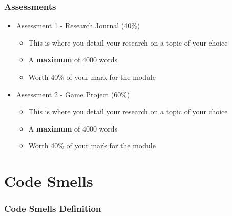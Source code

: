 \begin{frame}
	\frametitle{Assessments}
	\begin{itemize}
		\item Assessment 1 - Research Journal (40\%)
		\begin{itemize}
			\item This is where you detail your research on a topic of your choice
			\item A \textbf{maximum} of 4000 words
			\item Worth 40\% of your mark for the module
		\end{itemize}
		\item Assessment 2 - Game Project (60\%)
		\begin{itemize}
			\item This is where you detail your research on a topic of your choice
		\item A \textbf{maximum} of 4000 words
		\item Worth 40\% of your mark for the module
		\end{itemize}		
	\end{itemize}
\end{frame}

\section{Code Smells}

\begin{frame}
\frametitle{Code Smells Definition}
\end{frame}


